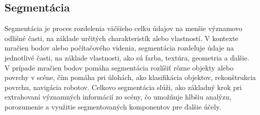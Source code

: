 \subsection{Segmentácia}
\noindent Segmentácia je proces rozdelenia väčšieho celku údajov na menšie významovo odlišné časti, na základe určitých charakteristík alebo vlastností. V kontexte mračien bodov alebo počítačového videnia, segmentácia rozdeľuje údaje na jednotlivé časti, na základe vlastnosti, ako sú farba, textúra, geometria a ďalšie. V prípade mračien bodov pomáha segmentácia rozlíšiť rôzne objekty alebo povrchy v scéne, čím pomáha pri úlohách, ako klasifikácia objektov, rekonštrukcia povrchu, navigácia robotov. Celkovo segmentácia slúži, ako základný krok pri extrahovaní významných informácií zo scény, čo umožňuje hlbšiu analýzu, porozumenie a využitie segmentovaných komponentov pre ďalšie účely. 
